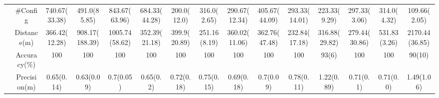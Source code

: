 \documentclass{article}
\begin{document}
\begin{table*}[!h]
{\begin{tabular}{c|cccccccccccccc}
    \multicolumn{1}{c|}{}                         & \multicolumn{1}{c|}{\#Config} & 740.67(33.38) & 491.0(85.85) & 843.67(63.96) & 684.33(44.28) & 200.0(12.0) & 316.0(2.65) & 290.67(12.34) & 405.67(44.09) & 293.33(14.01) & 223.33(9.29) & 297.33(3.06) & 314.0(4.32) & 109.66(2.05)\\
    \multicolumn{1}{c|}{}                         & \multicolumn{1}{c|}{Distance(m)} & 366.42(12.28) & 908.17(188.39) & 1005.74(58.62) & 352.39(21.18) & 399.9(20.89) & 251.16(8.19) & 360.02(11.06) & 362.76(47.48) & 232.84(17.18) & 316.88(29.82) & 279.44(30.86) & 531.83(3.26) & 2170.44(36.85)\\
    \multicolumn{1}{c|}{}                         & \multicolumn{1}{c|}{Accuracy(\%)} & 100 & 100 & 100 & 100 & 100 & 100 & 100 & 100 & 100 & 93(6) & 100 & 100 & 90(10)\\
    \multicolumn{1}{c|}{}                         & \multicolumn{1}{c|}{Precision(m)} & 0.65(0.14) & 0.63(0.09) & 0.7(0.05) & 0.65(0.2) & 0.72(0.18) & 0.75(0.15) & 0.69(0.18) & 0.7(0.09) & 0.78(0.11) & 1.22(0.89) & 0.71(0.1)  & 0.71(0.0) & 1.49(1.06)\\ \hline
    \end{tabular}}
    \label{tab:simulated_results}
\end{table*}
\end{document}

